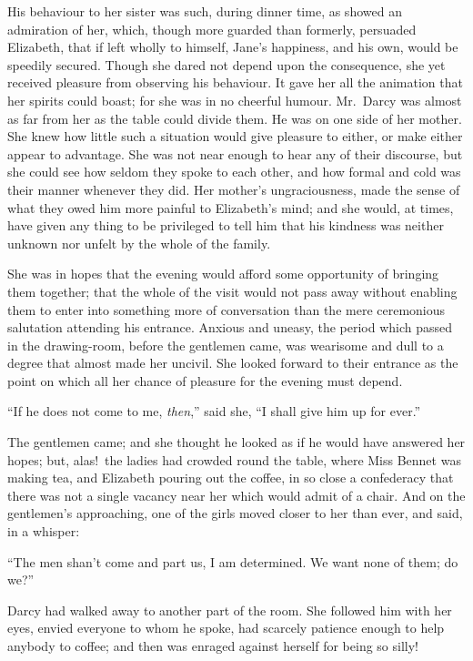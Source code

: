 \documentclass[12pt,english,oneside]{book}
\begin{document}
His behaviour to her sister was such, during dinner time, as showed
an admiration of her, which, though more guarded than formerly, persuaded
Elizabeth, that if left wholly to himself, Jane's happiness, and his
own, would be speedily secured. Though she dared not depend upon the
consequence, she yet received pleasure from observing his behaviour.
It gave her all the animation that her spirits could boast; for she
was in no cheerful humour. Mr.\ Darcy was almost as far from her
as the table could divide them. He was on one side of her mother.
She knew how little such a situation would give pleasure to either,
or make either appear to advantage. She was not near enough to hear
any of their discourse, but she could see how seldom they spoke to
each other, and how formal and cold was their manner whenever they
did. Her mother's ungraciousness, made the sense of what they owed
him more painful to Elizabeth's mind; and she would, at times, have
given any thing to be privileged to tell him that his kindness was
neither unknown nor unfelt by the whole of the family.

She was in hopes that the evening would afford some opportunity of
bringing them together; that the whole of the visit would not pass
away without enabling them to enter into something more of conversation
than the mere ceremonious salutation attending his entrance. Anxious
and uneasy, the period which passed in the drawing-room, before the
gentlemen came, was wearisome and dull to a degree that almost made
her uncivil. She looked forward to their entrance as the point on
which all her chance of pleasure for the evening must depend.

{}``If he does not come to me, \textit{then},'' said she, {}``I
shall give him up for ever.''

The gentlemen came; and she thought he looked as if he would have
answered her hopes; but, alas!\ the ladies had crowded round the
table, where Miss Bennet was making tea, and Elizabeth pouring out
the coffee, in so close a confederacy that there was not a single
vacancy near her which would admit of a chair. And on the gentlemen's
approaching, one of the girls moved closer to her than ever, and said,
in a whisper:

{}``The men shan't come and part us, I am determined. We want none
of them; do we?''\ 

Darcy had walked away to another part of the room. She followed him
with her eyes, envied everyone to whom he spoke, had scarcely patience
enough to help anybody to coffee; and then was enraged against herself
for being so silly!
\end{document}
